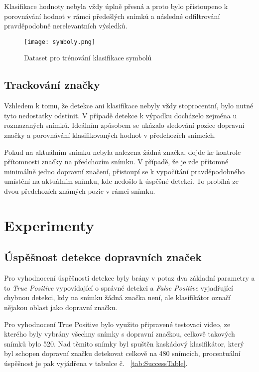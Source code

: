 \documentclass[czech]{ExcelAtFIT} %
\begin{document}
Klasifikace hodnoty nebyla vždy úplně přesná a proto bylo přistoupeno k porovnávání hodnot v rámci předešlých snímků a následné odfiltrování pravděpo\-dobně nerelevantních výsledků.

\begin{figure}[t]
\centering
\texttt{[image: symboly.png]}\\[1pt]
\caption{Dataset pro trénování klasifikace symbolů}
\label{fig:Symbols}
\end{figure}

\subsection{Trackování značky}
Vzhledem k tomu, že detekce ani klasifikace nebyly vždy stoprocentní, bylo nutné tyto nedostatky odstínit. V případě detekce k výpadku docházelo zejména u rozmazaných snímků. Ideálním způsobem se ukázalo sledování pozice dopravní značky a porovnávání klasifikovaných hodnot v předchozích snímcích.

Pokud na aktuálním snímku nebyla nalezena žádná značka, dojde ke kontrole přítomnosti značky na před\-chozím snímku. V případě, že je zde přítomné mini\-málně jedno dopravní značení, přistoupí se k vypočítání pravdě\-podobného umístění na aktuálním snímku, kde nedošlo k úspěšné detekci. To probíhá ze dvou předchozích známých pozic v rámci snímku.


\section{Experimenty}

\subsection{Úspěšnost detekce dopravních značek}
Pro vyhodnocení úspěšnosti detekce byly brány v potaz dva základní parametry a to \emph{True Positive} vypovídající o správné detekci a \emph{False Positive} vyjadřující chybnou detekci, kdy na snímku žádná značka není, ale klasifikátor označí nějakou oblast jako dopravní značku.

Pro vyhodnocení True Positive bylo využito při\-pravené testovací video, ze kterého byly vybrány vše\-chny snímky s dopravní značkou, celkově takových snímků bylo 520. Nad těmito snímky byl spuštěn kaskádový klasifikátor, který byl schopen dopravní značku detekovat celkově na 480 snímcích, procentuální úspěšnost je pak vyjádřena v tabulce č.  ~\ref{tab:SuccessTable}.
\end{document}
